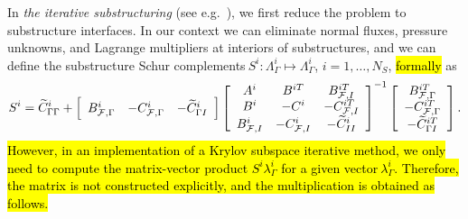 In \emph{the iterative substructuring} (see e.g.~\cite{Toselli-2005-DDM}), we first
reduce the problem to substructure interfaces. In our context we can eliminate
normal fluxes, pressure unknowns, and Lagrange multipliers at interiors of
substructures, and we can define the substructure Schur complements$~S^{i}%
:\Lambda_{\Gamma}^{i}\mapsto\Lambda_{\Gamma}^{i}$, $i=1,\dots,N_{S}$, \hl{formally} as
\hl{
\begin{equation}
S^{i} = 
\widetilde{C}_{{\Gamma}{\Gamma}}^{i} 
+ 
\left[
\begin{array}
[c]{ccc}%
B_{\mathcal{F},\Gamma}^{i} & -C_{\mathcal{F},\Gamma}^{i} & -\widetilde{C}_{{\Gamma}I}^{i}%
\end{array}
\right]  
\left[
\begin{array}
[c]{ccc}%
A^{i} & B^{iT} & B_{\mathcal{F},I}^{iT}\\
B^{i} & -C^{i} & -C_{\mathcal{F},I}^{iT}\\
B_{\mathcal{F},I}^{i} & -C_{\mathcal{F},I}^{i} & -\widetilde{C}_{II}^{i}%
\end{array}
\right]^{-1}
\left[
\begin{array}
[c]{c}%
B_{\mathcal{F},\Gamma}^{iT}\\
-C_{\mathcal{F},\Gamma}^{iT}\\
-\widetilde{C}_{{\Gamma}I}^{iT}%
\end{array}
\right] 
. 
\label{eq:substructure-schur}%
\end{equation}
}
\hl{However, in an implementation of a Krylov subspace iterative method, 
we only need to compute the matrix-vector
product $S^{i}\lambda_{\Gamma}^{i}$ for a given vector$~\lambda_{\Gamma}^{i}$.
Therefore, the matrix is not constructed explicitly, and  
the multiplication is obtained as follows.
}

